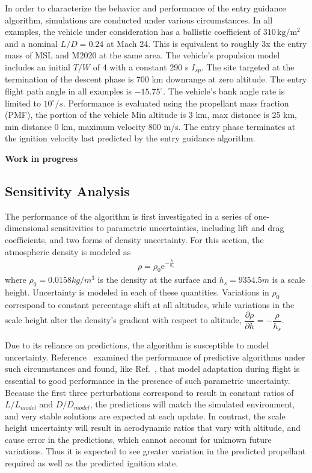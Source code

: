 \documentclass[letterpaper, preprint, paper,11pt]{AAS}
\begin{document}
In order to characterize the behavior and performance of the entry guidance algorithm, simulations are conducted under various circumstances. In all examples, the vehicle under consideration has a ballistic coefficient of $310\, \mathrm{kg/m^2}$ and a nominal $L/D=0.24$ at Mach 24. This is equivalent to roughly 3x the entry mass of MSL and M2020 at the same area.  The vehicle's propulsion model includes an initial $ T/W $ of 4 with a constant 290 s $ I_{sp} $. 
The site targeted at the termination of the descent phase is 700 km downrange at zero altitude. The entry flight path angle in all examples is $ -15.75^\circ $. The vehicle's bank angle rate is limited to $10 ^{\circ}/s$. Performance is evaluated using the propellant mass fraction (PMF), the portion of the vehicle 
Min altitude is 3 km, max distance is 25 km, min distance 0 km, maximum velocity 800 m/s. The entry phase terminates at the ignition velocity last predicted by the entry guidance algorithm.

\textbf{Work in progress}
\subsection{Sensitivity Analysis}
The performance of the algorithm is first investigated in a series of one-dimensional sensitivities to parametric uncertainties, including lift and drag coefficients, and two forms of density uncertainty. For this section, the atmospheric density is modeled as 
\begin{align}
\rho = \rho_0\mathrm{e}^{-\frac{h}{h_s}}
\end{align}
where $\rho_0 = 0.0158 kg/m^3$ is the density at the surface and $h_s = 9354.5 m$ is a scale height. Uncertainty is modeled in each of these quantities. Variations in $\rho_0$ correspond to constant percentage shift at all altitudes, while variations in the scale height alter the density's gradient with respect to altitude, $\dfrac{\partial\rho}{\partial h} = -\dfrac{\rho}{h_s}$.

Due to its reliance on predictions, the algorithm is susceptible to model uncertainty. Reference~\cite{predictor_corrector_analysis} examined the performance of predictive algorithms under such circumstances and found, like Ref.~\cite{lu2014entry}, that model adaptation during flight is essential to good performance in the presence of such parametric uncertainty. Because the first three perturbations correspond to result in constant ratios of $L/L_{model}$ and $ D/D_{model} $, the predictions will match the simulated environment, and very stable solutions are expected at each update. In contrast, the scale height uncertainty will result in aerodynamic ratios that vary with altitude, and cause error in the predictions, which cannot account for unknown future variations. Thus it is expected to see greater variation in the predicted propellant required as well as the predicted ignition state. 
\end{document}
